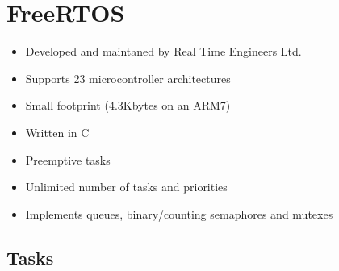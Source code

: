 \section{FreeRTOS}
\begin{itemize}
    \item Developed and maintaned by Real Time Engineers Ltd.
    \item Supports 23 microcontroller architectures
    \item Small footprint (4.3Kbytes on an ARM7)
    \item Written in C
    \item Preemptive tasks
    \item Unlimited number of tasks and priorities
    \item Implements queues, binary/counting semaphores and mutexes
\end{itemize}

\subsection{Tasks}

